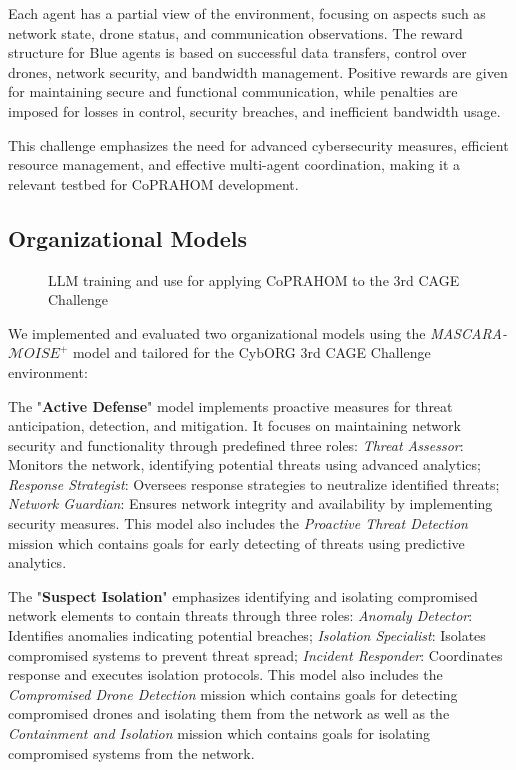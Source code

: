 \documentclass[a4paper,twoside]{article}
\begin{document}
Each agent has a partial view of the environment, focusing on aspects such as network state, drone status, and communication observations. The reward structure for Blue agents is based on successful data transfers, control over drones, network security, and bandwidth management. Positive rewards are given for maintaining secure and functional communication, while penalties are imposed for losses in control, security breaches, and inefficient bandwidth usage.

This challenge emphasizes the need for advanced cybersecurity measures, efficient resource management, and effective multi-agent coordination, making it a relevant testbed for CoPRAHOM development.

\subsection{Organizational Models}

\begin{figure}[h!]
    \centering
    
    \caption{LLM training and use for applying CoPRAHOM to the 3rd CAGE Challenge}\label{fig:llm_process}
\end{figure}


We implemented and evaluated two organizational models using the \textit{MASCARA-$\mathcal{M}OISE^+$} model and tailored for the CybORG 3rd CAGE Challenge environment:

The "\textbf{Active Defense}" model implements proactive measures for threat anticipation, detection, and mitigation. It focuses on maintaining network security and functionality through predefined three roles:
%
\textit{Threat Assessor}: Monitors the network, identifying potential threats using advanced analytics;
\textit{Response Strategist}: Oversees response strategies to neutralize identified threats;
\textit{Network Guardian}: Ensures network integrity and availability by implementing security measures.
%
This model also includes the \textit{Proactive Threat Detection} mission which contains goals for early detecting of threats using predictive analytics.

The "\textbf{Suspect Isolation}" emphasizes identifying and isolating compromised network elements to contain threats through three roles:
%
\textit{Anomaly Detector}: Identifies anomalies indicating potential breaches;
\textit{Isolation Specialist}: Isolates compromised systems to prevent threat spread;
\textit{Incident Responder}: Coordinates response and executes isolation protocols.
%
This model also includes the \textit{Compromised Drone Detection} mission which contains goals for detecting compromised drones and isolating them from the network as well as the \textit{Containment and Isolation} mission which contains goals for isolating compromised systems from the network.
\end{document}
